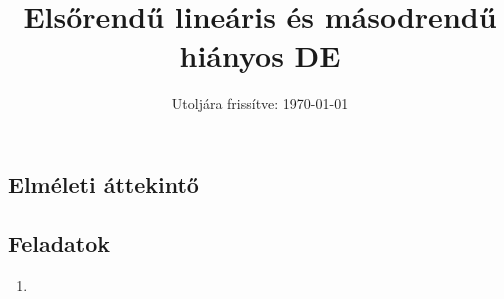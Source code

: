 \documentclass{szb-practice}
\title{Elsőrendű lineáris és másodrendű hiányos DE}
\date{Utoljára frissítve: \today}
\begin{document}
\maketitle

\subsection{Elméleti áttekintő}

\clearpage
\subsection{Feladatok}

\begin{enumerate}
  \item
\end{enumerate}
\end{document}
